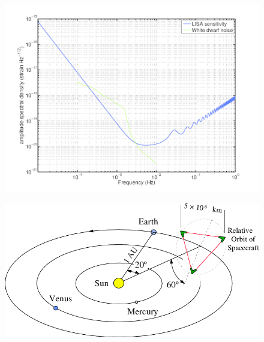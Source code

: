 

\begin{figure}[]
\begin{center}
\includegraphics[width=1\columnwidth]{./figures/lisacurve/lisacurve}
\caption{ \protect}
\end{center}
\end{figure}


\begin{figure}[]
\begin{center}
\includegraphics[width=1\columnwidth]{./figures/fig8/fig8}
\caption{ \protect}
\end{center}
\end{figure}




{}


